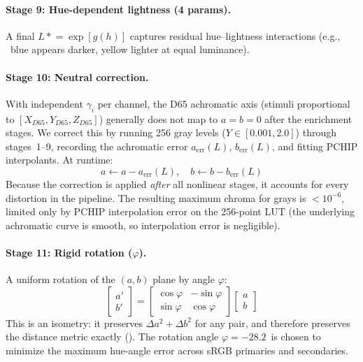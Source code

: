 \documentclass[11pt, twocolumn]{article}
\newcommand{\eg}{e.g.,\,}
\begin{document}
\paragraph{Stage 9: Hue-dependent lightness (4 params).}
A final $L \mathrel{*}= \exp[g(h)]$ captures residual hue--lightness
interactions (\eg\ blue appears darker, yellow lighter at equal
luminance).

\paragraph{Stage 10: Neutral correction.}
With independent $\gamma_i$ per channel, the D65 achromatic axis
(stimuli proportional to $[X_{D65}, Y_{D65}, Z_{D65}]$) generally
does not map to $a\!=\!b\!=\!0$ after
the enrichment stages. We correct this by running 256 gray levels
($Y \in [0.001, 2.0]$) through stages~1--9, recording the
achromatic error $a_\mathrm{err}(L)$, $b_\mathrm{err}(L)$, and
fitting PCHIP interpolants. At runtime:
\begin{equation}
  a \leftarrow a - a_\mathrm{err}(L), \quad b \leftarrow b - b_\mathrm{err}(L)
  \label{eq:nc}
\end{equation}
Because the correction is applied \emph{after} all nonlinear stages,
it accounts for every distortion in the pipeline. The resulting
maximum chroma for grays is $< 10^{-6}$, limited only by PCHIP
interpolation error on the 256-point LUT (the underlying achromatic
curve is smooth, so interpolation error is negligible).

\paragraph{Stage 11: Rigid rotation ($\varphi$).}
A uniform rotation of the $(a,b)$ plane by angle $\varphi$:
\begin{equation}
  \begin{bmatrix} a' \\ b' \end{bmatrix} = \begin{bmatrix} \cos\varphi & -\sin\varphi \\ \sin\varphi & \cos\varphi \end{bmatrix} \begin{bmatrix} a \\ b \end{bmatrix}
  \label{eq:rotation}
\end{equation}
This is an isometry: it preserves $\Delta a^2 + \Delta b^2$ for any
pair, and therefore preserves the distance metric exactly
(). The rotation angle
$\varphi = -28.2$\textdegree\ is chosen to minimize the maximum
hue-angle error across sRGB primaries and secondaries.
\end{document}

